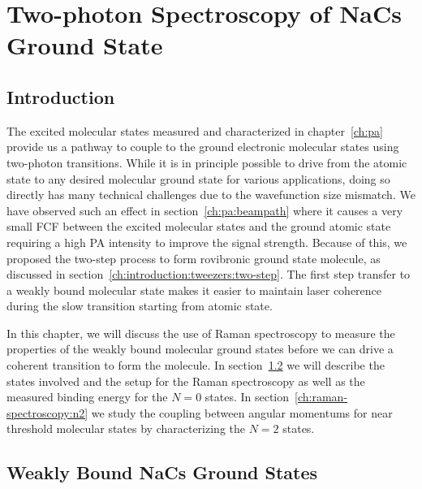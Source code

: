 
\chapter{Two-photon Spectroscopy of NaCs Ground State}
\label{ch:raman-spectroscopy}

\section{Introduction}
\label{ch:raman-spectroscopy:introduction}

The excited molecular states measured and characterized in chapter~\ref{ch:pa}
provide us a pathway to couple to the ground electronic molecular states
using two-photon transitions.
While it is in principle possible to drive from the atomic state
to any desired molecular ground state for various applications,
doing so directly has many technical challenges due to the wavefunction size mismatch.
We have observed such an effect in section~\ref{ch:pa:beampath}
where it causes a very small FCF between the excited molecular states
and the ground atomic state requiring a high PA intensity to improve the signal strength.
Because of this, we proposed the two-step process to form rovibronic ground state molecule,
as discussed in section~\ref{ch:introduction:tweezers:two-step}.
The first step transfer to a weakly bound molecular state makes it easier
to maintain laser coherence during the slow transition starting from atomic state.

In this chapter, we will discuss the use of Raman spectroscopy
to measure the properties of the weakly bound molecular ground states
before we can drive a coherent transition to form the molecule.
In section~\ref{ch:raman-spectroscopy:states}
we will describe the states involved and the setup for the Raman spectroscopy
as well as the measured binding energy for the $N=0$ states.
In section~\ref{ch:raman-spectroscopy:n2}
we study the coupling between angular momentums for near threshold molecular states
by characterizing the $N=2$ states.

\section{Weakly Bound NaCs Ground States}
\label{ch:raman-spectroscopy:states}

